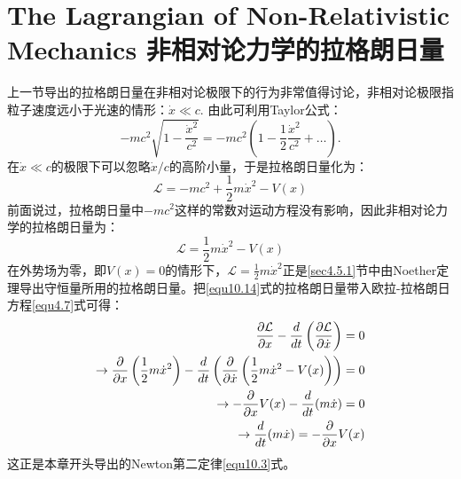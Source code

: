 \section[非相对论力学的拉格朗日量]{The Lagrangian of Non-Relativistic Mechanics \quad 非相对论力学的拉格朗日量}
\label{sec10.2}
上一节导出的拉格朗日量在非相对论极限下的行为非常值得讨论，非相对论极限指粒子速度远小于光速的情形：$\dot{x} \ll c$. 由此可利用Taylor公式：
\begin{equation}
\label{equ10.12}
    -mc^2 \sqrt{1 - \frac{\dot{x}^2}{c^2}} = -mc^2 \left( 1 - \frac{1}{2} \frac{\dot{x}^2}{c^2} + \dots \right).
\end{equation}
在$\dot{x} \ll c$的极限下可以忽略$\dot{x}/c$的高阶小量，于是拉格朗日量化为：
\begin{equation}
\label{equ10.13}
    \mathcal{L} = -mc^2 + \frac{1}{2} m \dot{x}^2 - V(x)
\end{equation}
前面说过，拉格朗日量中$-mc^2$这样的常数对运动方程没有影响，因此{非相对论力学的拉格朗日量}为：
\begin{equation}
\label{equ10.14}
    \mathcal{L} = \frac{1}{2} m \dot{x}^2 - V(x)
\end{equation}
在外势场为零，即$V(x) = 0$的情形下，$\mathcal{L} = \frac{1}{2} m \dot{x}^2$正是\ref{sec4.5.1}节中由Noether定理导出守恒量所用的拉格朗日量。把\ref{equ10.14}式的拉格朗日量带入欧拉-拉格朗日方程\ref{equ4.7}式可得：
\begin{align}
    \frac{\partial \mathcal{L}}{\partial x} - \frac{d}{dt} \left( \frac{\partial \mathcal{L}}{\partial \dot{x}} \right) = 0 \notag \\
    \to \frac{\partial}{\partial x} \left( \frac{1}{2} m \dot{x}^2 \right) - \frac{d}{dt} \left( \frac{\partial}{\partial \dot{x}} \left( \frac{1}{2} m \dot{x}^2 - V(x) \right) \right) = 0 \notag \\
    \to -\frac{\partial}{\partial x} V(x) - \frac{d}{dt} (m \dot{x}) = 0 \notag \\
\label{equ10.15}
    \to \frac{d}{dt} (m \dot{x}) = - \frac{\partial}{\partial x} V(x)
\end{align}
这正是本章开头导出的Newton第二定律\ref{equ10.3}式。
